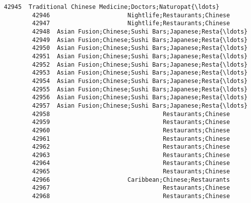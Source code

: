 \documentclass[11pt]{article}
\begin{document}
\begin{Verbatim}[commandchars=\\\{\}]
        42945  Traditional Chinese Medicine;Doctors;Naturopat{\ldots}   
        42946                      Nightlife;Restaurants;Chinese   
        42947                      Nightlife;Restaurants;Chinese   
        42948  Asian Fusion;Chinese;Sushi Bars;Japanese;Resta{\ldots}   
        42949  Asian Fusion;Chinese;Sushi Bars;Japanese;Resta{\ldots}   
        42950  Asian Fusion;Chinese;Sushi Bars;Japanese;Resta{\ldots}   
        42951  Asian Fusion;Chinese;Sushi Bars;Japanese;Resta{\ldots}   
        42952  Asian Fusion;Chinese;Sushi Bars;Japanese;Resta{\ldots}   
        42953  Asian Fusion;Chinese;Sushi Bars;Japanese;Resta{\ldots}   
        42954  Asian Fusion;Chinese;Sushi Bars;Japanese;Resta{\ldots}   
        42955  Asian Fusion;Chinese;Sushi Bars;Japanese;Resta{\ldots}   
        42956  Asian Fusion;Chinese;Sushi Bars;Japanese;Resta{\ldots}   
        42957  Asian Fusion;Chinese;Sushi Bars;Japanese;Resta{\ldots}   
        42958                                Restaurants;Chinese   
        42959                                Restaurants;Chinese   
        42960                                Restaurants;Chinese   
        42961                                Restaurants;Chinese   
        42962                                Restaurants;Chinese   
        42963                                Restaurants;Chinese   
        42964                                Restaurants;Chinese   
        42965                                Restaurants;Chinese   
        42966                      Caribbean;Chinese;Restaurants   
        42967                                Restaurants;Chinese   
        42968                                Restaurants;Chinese   
        

\end{Verbatim}
\end{document}

